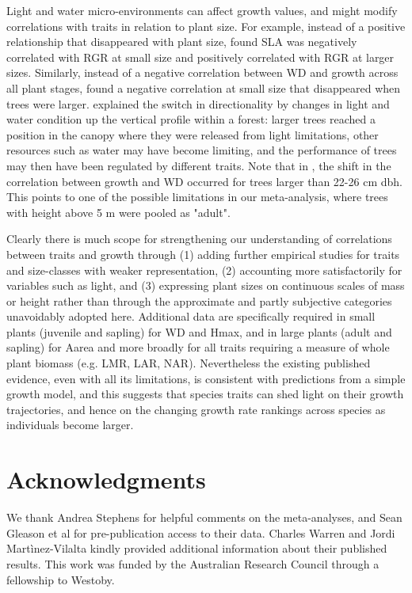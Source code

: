 \documentclass[a4paper]{article}\usepackage[]{graphicx}\usepackage[]{color}
\begin{document}
Light and water micro-environments can affect growth values, and might modify correlations with traits in relation to plant size. For example, instead of a positive relationship that disappeared with plant size, \citet{Iida:2014ep} found SLA was negatively correlated with RGR at small size and positively correlated with RGR at larger sizes. Similarly, instead of a negative correlation between WD and growth across all plant stages, \citep{Iida:2014ep,Iida:2014hq} found a negative correlation at small size that disappeared when trees were larger. \citet{Iida:2014hq} explained the switch in directionality by changes in light and water condition up the vertical profile within a forest: larger trees reached a position in the canopy where they were released from light limitations, other resources such as water may have become limiting, and the performance of trees may then have been regulated by different traits. Note that in \citet{Iida:2014hq}, the shift in the correlation between growth and WD occurred for trees larger than 22-26 cm dbh. This points to one of the possible limitations in our meta-analysis, where trees with height above 5 m were pooled as "adult". 

Clearly there is much scope for strengthening our understanding of correlations between traits and growth through (1) adding further empirical studies for traits and size-classes with weaker representation, (2) accounting more satisfactorily for variables such as light, and (3) expressing plant sizes on continuous scales of mass or height rather than through the approximate and partly subjective categories unavoidably adopted here. Additional data are specifically required in small plants (juvenile and sapling) for WD and Hmax, and in large plants (adult and sapling) for Aarea and more broadly for all traits requiring a measure of whole plant biomass (e.g. LMR, LAR, NAR). Nevertheless the existing published evidence, even with all its limitations, is consistent with predictions from a simple growth model, and this suggests that species traits can shed light on their growth trajectories, and hence on the changing growth rate rankings across species as individuals become larger. 



\section*{Acknowledgments}\label{Acknowledgment}

We thank Andrea Stephens for helpful comments on the meta-analyses, and Sean Gleason et al for pre-publication access to their data. Charles Warren and Jordi Martìnez-Vilalta kindly provided additional information about their published results. This work was funded by the Australian Research Council through a fellowship to Westoby.  
\end{document}
